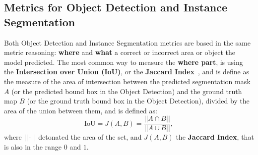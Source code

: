 \subsection{Metrics for Object Detection and Instance Segmentation} \label{sec:metrics}
Both Object Detection and Instance Segmentation metrics are based in the same metric reasoning: \textbf{where} and \textbf{what} a correct or incorrect area or object the model predicted. The most common way to measure the \textbf{where part}, is using the \textbf{Intersection over Union (IoU)}, or the \textbf{Jaccard Index}~\cite{Jaccard1912, 10.5169/SEALS-266450}, and is define as the measure of the area of intersection between the predicted segmentation mask $A$ (or the predicted bound box in the Object Detection) and the ground truth map $B$ (or the ground truth bound box in the Object Detection), divided by the area of the union between them, and is defined as:
\begin{equation}
\mathrm{IoU}=J(A, B)=\frac{||A \cap B||}{||A \cup B||},
\end{equation}
where $||\cdot||$ detonated the area of the set, and $J(A, B)$ the \textbf{Jaccard Index}, that is also in the range $0$ and $1$.\\

